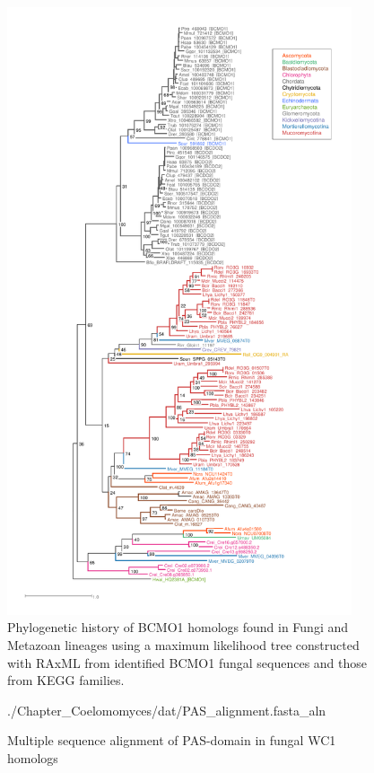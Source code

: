 \begin{figure}[htbp]
  \includegraphics[width=4in]{./Chapter_Coelomomyces/img/BCMO1DO2.png}
  \caption[BCMO1 history]{Phylogenetic history of BCMO1 homologs found in Fungi and Metazoan lineages using a maximum likelihood tree constructed with RAxML from identified BCMO1 fungal sequences and those from KEGG families.}
  \label{fig:ChClat_BCMO1DO2}
\end{figure}

\pagebreak[4]
\begin{figure}[tbp]
  \begin{texshade}{./Chapter_Coelomomyces/dat/PAS_alignment.fasta_aln}
  \end{texshade}
  \caption[PAS alignment of WC1 homologs]{Multiple sequence alignment of PAS-domain in fungal WC1 homologs}
  \label{fig:ChClat_PASaln}
\end{figure}
